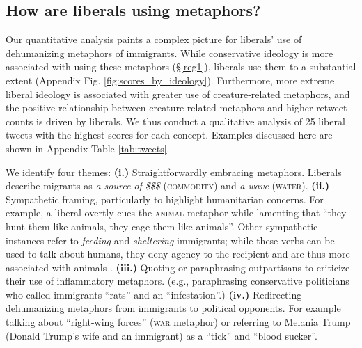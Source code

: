 \subsection{How are liberals using metaphors?}

Our quantitative analysis paints a complex picture for liberals' use of dehumanizing metaphors of immigrants.%
While conservative ideology is more associated with using these metaphors (§\ref{reg1}), liberals use them to a substantial extent (Appendix Fig. \ref{fig:scores_by_ideology}). Furthermore, more extreme liberal ideology is associated with greater use of creature-related metaphors, %
and the positive relationship between creature-related metaphors and higher retweet counts is driven by liberals. We thus conduct a qualitative analysis of 25 liberal tweets with the highest scores for each concept. Examples discussed here are shown in Appendix Table \ref{tab:tweets}. 

We identify four themes: 
{\bf(i.)} Straightforwardly embracing metaphors. Liberals describe migrants as \textit{a source of \$\$\$} (\textsc{commodity}) and \textit{a wave} (\textsc{water}).
{\bf(ii.)} Sympathetic framing, particularly to highlight humanitarian concerns. For example, a liberal overtly cues the \textsc{animal} metaphor while lamenting that ``they hunt them like animals, they cage them like animals''. Other sympathetic instances refer to \textit{feeding} and \textit{sheltering} immigrants; while these verbs can be used to talk about humans, they deny agency to the recipient and are thus more associated with animals \citep{tipler_agencys_2014}.
{\bf(iii.)} Quoting or paraphrasing outpartisans to criticize their use of inflammatory metaphors. 
(e.g., 
paraphrasing conservative politicians who called immigrants ``rats'' and an ``infestation''.)
{\bf(iv.)} Redirecting dehumanizing metaphors from immigrants to political opponents. For example 
talking about ``right-wing forces'' (\textsc{war} metaphor) or referring to Melania Trump (Donald Trump's wife and an immigrant) as a ``tick'' and ``blood sucker''.








